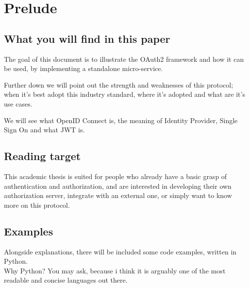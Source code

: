 \section{Prelude}

\subsection{What you will find in this paper}
The goal of this document is to illustrate the OAuth2 framework and how it can
be used, by implementing a standalone micro-service.

Further down we will point out the strength and weaknesses of this protocol;
%
when it's best adopt this industry standard, where it's adopted and what are
it's use cases.

We will see what OpenID Connect is, the meaning of Identity Provider, Single
Sign On and what JWT is.


\subsection{Reading target}
This academic thesis is suited for people who already have a basic grasp of
authentication and authorization, and are interested in developing their own
authorization server, integrate with an external one, or simply want to know
more on this protocol.


\subsection{Examples}
Alongside explanations, there will be included some code examples, written in
Python.
\\
Why Python? You may ask,
%
because i think it is arguably one of the most readable
and concise languages out there.
